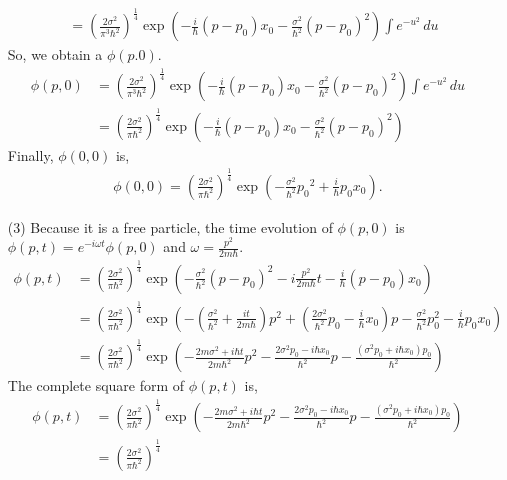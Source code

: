 \documentclass[floatfix,nofootinbib,superscriptaddress,fleqn]{revtex4}
\begin{document}
\begin{itemize}
\begin{align}
    &= {\left(\frac{2\sigma^2}{\pi^3\hbar^2}\right)}^{\frac{1}{4}}
    \exp\left( -\frac{i}{\hbar}(p-p_0)x_0
    -\frac{\sigma^2}{\hbar^2}(p-p_0)^2 \right)
    \int e^{-u^2}\,du
  \end{align}
  So, we obtain a $\phi(p.0)$.
  \begin{align}
    \phi(p,0) &= {\left(\frac{2\sigma^2}{\pi^3\hbar^2}\right)}
    ^{\frac{1}{4}}
    \exp\left( -\frac{i}{\hbar}(p-p_0)x_0
    -\frac{\sigma^2}{\hbar^2}(p-p_0)^2 \right)
    \int e^{-u^2}\,du \\
    &= {\left(\frac{2\sigma^2}{\pi\hbar^2}\right)}^{\frac{1}{4}}
    \exp\left( -\frac{i}{\hbar}(p-p_0)x_0
    -\frac{\sigma^2}{\hbar^2}(p-p_0)^2 \right)
  \end{align}
  Finally, $\phi(0,0)$ is,
  \begin{align}
    \phi(0,0) = {\left(\frac{2\sigma^2}{\pi\hbar^2}\right)}^{\frac{1}{4}}
    \exp\left(-\frac{\sigma^2}{\hbar^2}{p_0}^2+\frac{i}{\hbar}p_0x_0\right).
  \end{align}
  \item[(3)]Because it is a free particle, the time evolution of 
  $\phi(p,0)$ is $\phi(p,t)=e^{-i\omega t}\phi(p,0)$ 
  and $\omega = \frac{p^2}{2m\hbar}$.
  \begin{align}
    \phi(p,t) &={\left(\frac{2\sigma^2}{\pi\hbar^2}\right)}^{\frac{1}{4}}
      \exp\left(-\frac{\sigma^2}{\hbar^2}(p-p_0)^2-i\frac{p^2}{2m\hbar}t
      -\frac{i}{\hbar}(p-p_0)x_0 \right) \\
    &={\left(\frac{2\sigma^2}{\pi\hbar^2}\right)}^{\frac{1}{4}}
      \exp\left(-\left(\frac{\sigma^2}{\hbar^2} 
     +\frac{it}{2m\hbar}\right)p^2 
     +\left(\frac{2\sigma^2}{\hbar^2}p_0-\frac{i}{\hbar}x_0\right)p 
     -\frac{\sigma^2}{\hbar^2}p_0^2-\frac{i}{\hbar}p_0x_0 \right) \\ 
    &={\left(\frac{2\sigma^2}{\pi\hbar^2}\right)}^{\frac{1}{4}}
      \exp\left(-\frac{2m\sigma^2+i\hbar t}{2m\hbar^2}p^2 
      -\frac{2\sigma^2p_0-i\hbar x_0}{\hbar^2}p
      -\frac{\left(\sigma^2p_0+i\hbar x_0\right)p_0}{\hbar^2} \right)
  \end{align}
  The complete square form of $\phi(p,t)$ is,
  \begin{align}
    \phi(p,t) &={\left(\frac{2\sigma^2}{\pi\hbar^2}\right)}^{\frac{1}{4}}
      \exp\left(-\frac{2m\sigma^2+i\hbar t}{2m\hbar^2} p^2 
    -\frac{2\sigma^2p_0-i\hbar x_0}{\hbar^2}p
    -\frac{\left(\sigma^2p_0+i\hbar x_0\right)p_0}{\hbar^2}\right) \\
    &={\left(\frac{2\sigma^2}{\pi\hbar^2}\right)}^{\frac{1}{4}}

\end{align}
\end{itemize}
\end{document}
